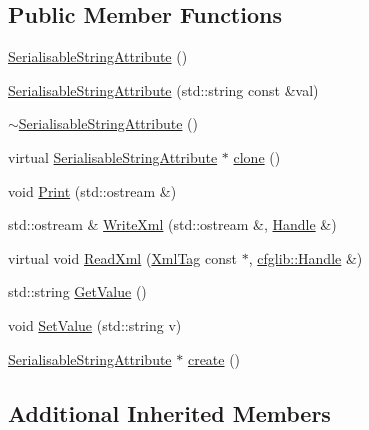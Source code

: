 \subsection*{Public Member Functions}
\begin{DoxyCompactItemize}
\item 
\hyperlink{classcfglib_1_1SerialisableStringAttribute_a1b3dd845194091ebd803f88a36a8ac64}{Serialisable\+String\+Attribute} ()
\item 
\hyperlink{classcfglib_1_1SerialisableStringAttribute_a6d63152ea3ce76cf7efe4529eded7c14}{Serialisable\+String\+Attribute} (std\+::string const \&val)
\item 
\hyperlink{classcfglib_1_1SerialisableStringAttribute_a0dcb908722c68595d0962ee55fc4b92f}{$\sim$\+Serialisable\+String\+Attribute} ()
\item 
virtual \hyperlink{classcfglib_1_1SerialisableStringAttribute}{Serialisable\+String\+Attribute} $\ast$ \hyperlink{classcfglib_1_1SerialisableStringAttribute_a8c1e4b8b3edbb39c85216d2b2cf8ec38}{clone} ()
\item 
void \hyperlink{classcfglib_1_1SerialisableStringAttribute_a7149bb6d92d50db794bde6867cef4550}{Print} (std\+::ostream \&)
\item 
std\+::ostream \& \hyperlink{classcfglib_1_1SerialisableStringAttribute_a25ca4cd51b9acd75e7c75640028e2310}{Write\+Xml} (std\+::ostream \&, \hyperlink{classcfglib_1_1Handle}{Handle} \&)
\item 
virtual void \hyperlink{classcfglib_1_1SerialisableStringAttribute_aa001915e6a54ea8549b4e44da4cade74}{Read\+Xml} (\hyperlink{classXmlTag}{Xml\+Tag} const $\ast$, \hyperlink{classcfglib_1_1Handle}{cfglib\+::\+Handle} \&)
\item 
std\+::string \hyperlink{classcfglib_1_1SerialisableStringAttribute_af03bc94771d0997eb1a78f05b6f763a9}{Get\+Value} ()
\item 
void \hyperlink{classcfglib_1_1SerialisableStringAttribute_acb99eee7e7ab298a0fc425ca956edd31}{Set\+Value} (std\+::string v)
\item 
\hyperlink{classcfglib_1_1SerialisableStringAttribute}{Serialisable\+String\+Attribute} $\ast$ \hyperlink{classcfglib_1_1SerialisableStringAttribute_aa9235315d09c87b3ac945ddde53fe85c}{create} ()
\end{DoxyCompactItemize}
\subsection*{Additional Inherited Members}


